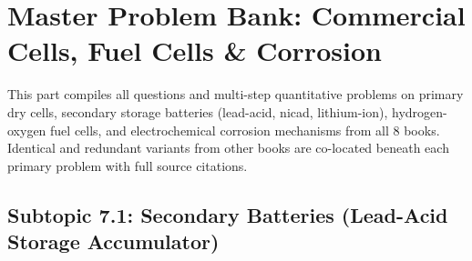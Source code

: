 \chapter{Master Problem Bank: Commercial Cells, Fuel Cells \& Corrosion}
\label{chap:qb_batteries_corrosion}

\begin{tcolorbox}[enhanced,colback=subtleamber,colframe=primarynavy,arc=2mm,boxrule=1pt,
    title=\textbf{\large Part VII Organization: Commercial Batteries, Fuel Cells \& Corrosion}]
This part compiles all questions and multi-step quantitative problems on primary dry cells, secondary storage batteries (lead-acid, nicad, lithium-ion), hydrogen-oxygen fuel cells, and electrochemical corrosion mechanisms from all 8 books. Identical and redundant variants from other books are co-located beneath each primary problem with full source citations.
\end{tcolorbox}

\section{Subtopic 7.1: Secondary Batteries (Lead-Acid Storage Accumulator)}


